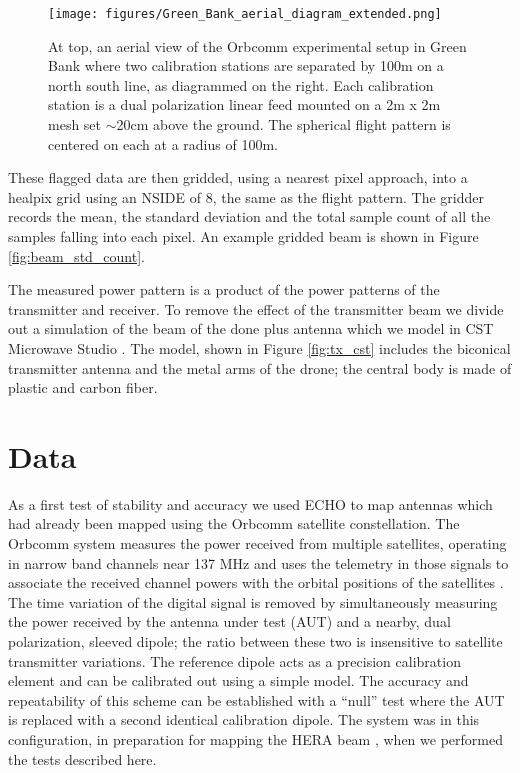 \documentclass[preprint2,numberedappendix,tighten,twocolappendix]{aastex6}
\begin{document}
\begin{figure}
\begin{center}
\texttt{[image: figures/Green\_Bank\_aerial\_diagram\_extended.png]}
\caption{At top, an aerial view of the Orbcomm experimental setup in Green Bank where two calibration stations are separated by 100m on a north south line, as diagrammed on the right. Each calibration station is a dual polarization linear feed mounted on a 2m x 2m mesh set $\sim$20cm above the ground. The spherical flight pattern is centered on each at a radius of 100m.}
\label{fig:GB_aerial}
\end{center}
\end{figure}


These flagged data are then gridded, using a nearest pixel approach, into a healpix grid using an NSIDE of 8, the same as the flight pattern.  The gridder records the mean, the standard deviation and the total sample count of all the samples falling into each pixel. An example gridded beam is shown in Figure \ref{fig:beam_std_count}.

The measured power pattern is a product of the power patterns of the transmitter and receiver. To remove the effect of the transmitter beam we divide out a simulation of the beam of the done plus antenna which we model in CST Microwave Studio . The model, shown in Figure \ref{fig:tx_cst} includes the biconical transmitter antenna and the metal arms of the drone; the central body is made of plastic and carbon fiber.  

  




\section{Data}
As a first test of stability and accuracy we used ECHO to map antennas which had already been mapped using the Orbcomm satellite constellation.  The Orbcomm system measures the power received from multiple satellites, operating in narrow band channels near 137 MHz and uses the telemetry in those signals to associate the received channel powers with the orbital positions of the satellites \citep{2015RaSc...50..614N}.   The time variation of the digital signal is removed by simultaneously measuring the power received by the antenna under test (AUT) and a nearby, dual polarization, sleeved dipole; the ratio between these two is insensitive to satellite transmitter variations. The reference dipole acts as a precision calibration element and can be calibrated out using a simple model.  The accuracy and repeatability of this scheme can be established with a ``null'' test where the AUT is replaced with a second identical calibration dipole.  The system was in this configuration, in preparation for mapping the HERA beam \citep{Neben2016_HERAOrbcomm}, when we performed the tests described here.  
\end{document}
